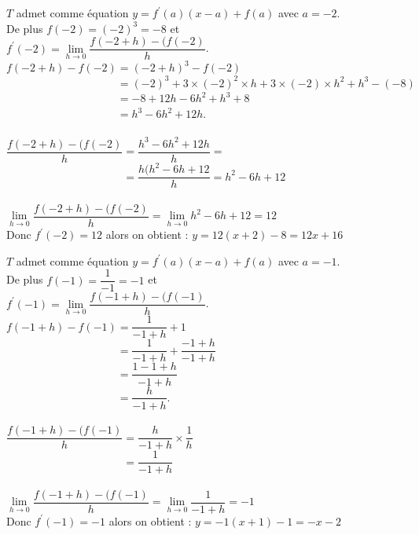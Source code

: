 \documentclass[12pt,a5paper]{book}
\begin{document}
\begin{enumMet}
    \item $T$ admet comme équation $y=f^{\prime}(a)(x-a)+f(a)$ avec $a=-2$.\\
    De plus $f(-2)=(-2)^{3}=-8$ et\\
    $f^{\prime}(-2)=\lim\limits_{h \rightarrow 0} \dfrac{f(-2+h)-(f(-2)}{h}$.\\
    $f(-2+h)-f(-2)=(-2+h)^3-f(-2)$\\
    $\phantom{f(-2+h)-f(-2)}=(-2)^3+3\times(-2)^2\times h+3\times(-2)\times h^2+h^3-(-8)$\\
    $\phantom{f(-2+h)-f(-2)}=-8+12h-6h^2+h^3+8$\\
    $\phantom{f(-2+h)-f(-2)}=h^3-6h^2+12h$.\\
    \ \\
    $\dfrac{f(-2+h)-(f(-2)}{h}=\dfrac{h^3-6h^2+12h}{h}=$\\
    $\phantom{\dfrac{f(-2+h)-(f(-2)}{h}}=\dfrac{h(h^2-6h+12}{h}=h^2-6h+12$\\
    \ \\
    $\lim\limits_{h \rightarrow 0} \dfrac{f(-2+h)-(f(-2)}{h}= \lim\limits_{h \rightarrow 0} h^2-6h+12=12$\\
    Donc $f^{\prime}(-2)=12$ alors on obtient : $y=12(x+2)-8=12x+16$
    \item $T$ admet comme équation $y=f^{\prime}(a)(x-a)+f(a)$ avec $a=-1$.\\
    De plus $f(-1)=\dfrac{1}{-1}=-1$ et\\
    $f^{\prime}(-1)=\lim\limits_{h \rightarrow 0} \dfrac{f(-1+h)-(f(-1)}{h}$.\\
    $f(-1+h)-f(-1)=\dfrac{1}{-1+h}+1$\\
    $\phantom{f(-2+h)-f(-2)}=\dfrac{1}{-1+h}+\dfrac{-1+h}{-1+h}$\\
    $\phantom{f(-2+h)-f(-2)}=\dfrac{1-1+h}{-1+h}$\\
    $\phantom{f(-2+h)-f(-2)}=\dfrac{h}{-1+h}$.\\
    \ \\
    $\dfrac{f(-1+h)-(f(-1)}{h}=\dfrac{h}{-1+h}\times\dfrac{1}{h}$\\
    $\phantom{\dfrac{f(-2+h)-(f(-2)}{h}}=\dfrac{1}{-1+h}$\\
    \ \\
    $\lim\limits_{h \rightarrow 0} \dfrac{f(-1+h)-(f(-1)}{h}= \lim\limits_{h \rightarrow 0} \dfrac{1}{-1+h}=-1$\\
    Donc $f^{\prime}(-1)=-1$ alors on obtient : $y=-1(x+1)-1=-x-2$
\end{enumMet}
\end{document}
